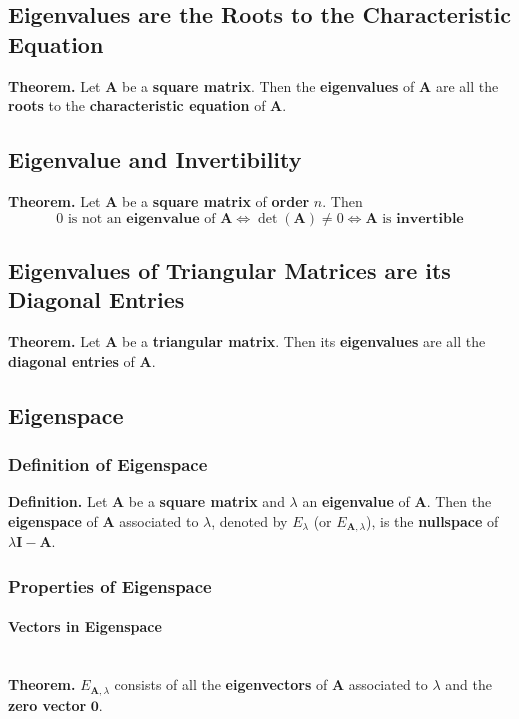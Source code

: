 \documentclass[../ma2001_notes.tex]{subfiles}
\begin{document}
\subsection{Eigenvalues are the Roots to the Characteristic Equation}
\textbf{Theorem.} Let \(\bm{A}\) be a \textbf{square matrix}. Then the \textbf{eigenvalues} of \(\bm{A}\) are all the \textbf{roots} to the \textbf{characteristic equation} of \(\bm{A}\).

\subsection{Eigenvalue and Invertibility}
\textbf{Theorem.} Let \(\bm{A}\) be a \textbf{square matrix} of \textbf{order} \(n\). Then
\[0\text{ is not an }\textbf{eigenvalue}\text{ of }\bm{A}\Leftrightarrow\det(\bm{A})\ne0\Leftrightarrow\bm{A}\text{ is }\textbf{invertible}\]

\subsection{Eigenvalues of Triangular Matrices are its Diagonal Entries}
\textbf{Theorem.} Let \(\bm{A}\) be a \textbf{triangular matrix}. Then its \textbf{eigenvalues} are all the \textbf{diagonal entries} of \(\bm{A}\).

\subsection{Eigenspace}
\subsubsection{Definition of Eigenspace}
\textbf{Definition.} Let \(\bm{A}\) be a \textbf{square matrix} and \(\lambda\) an \textbf{eigenvalue} of \(\bm{A}\). Then the \textbf{eigenspace} of \(\bm{A}\) associated to \(\lambda\), denoted by \(E_\lambda\) (or \(E_{\bm{A},\lambda}\)), is the \textbf{nullspace} of \(\lambda\bm{I}-\bm{A}\).

\subsubsection{Properties of Eigenspace}
\paragraph{Vectors in Eigenspace}\,\\
\textbf{Theorem.} \(E_{\bm{A},\lambda}\) consists of all the \textbf{eigenvectors} of \(\bm{A}\) associated to \(\lambda\) and the \textbf{zero vector} \(\bm{0}\).
\end{document}
